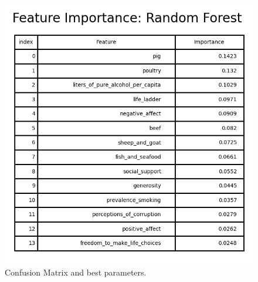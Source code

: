                 \begin{figure}[H]
                        \centering
                        \includegraphics[scale=1]{images/dm_featu_imp_random_forest}
                        \caption{Confusion Matrix and best parameters.}
                        \label{fig:dm-random-forest-bp}
                \end{figure}

